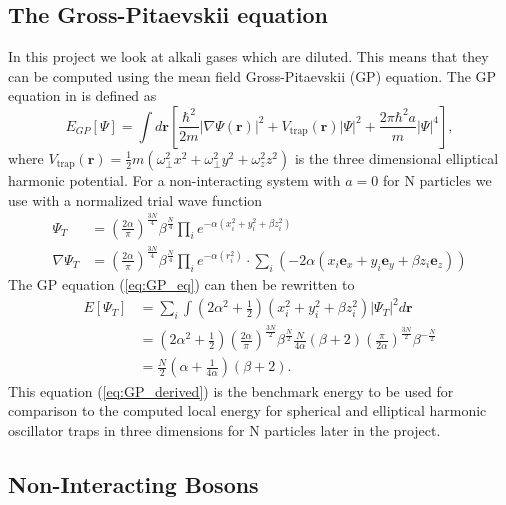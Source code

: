 \documentclass[12pt,a4paper,english]{article}
\begin{document}
\subsection{The Gross-Pitaevskii equation}
\label{subsect:GP_eq}
In this project we look at alkali gases which are diluted. This means that they can be computed using the mean field Gross-Pitaevskii (GP) equation. The GP equation in \citet{dubois2001bose} is defined as
\begin{equation}
\label{eq:GP_eq}
E_{GP}[\Psi]=\int d\textbf{r}\left[\frac{\hbar^2}{2m}|\nabla\Psi(\textbf{r})|^2+V_{\text{trap}}(\textbf{r})|\Psi|^2+\frac{2\pi\hbar^2a}{m}|\Psi|^4\right],
\end{equation}
where $V_{\text{trap}}(\textbf{r})=\frac{1}{2}m(\omega_{\perp}^2x^2+\omega_{\perp}^2y^2+\omega_z^2z^2)$ is the three dimensional elliptical harmonic potential. For a non-interacting system with $a=0$ for N particles we use with a normalized trial wave function 
\begin{align}
\label{eq:norm_WF_T}
\Psi_T&=\left(\frac{2\alpha}{\pi}\right)^{\frac{3N}{4}}\beta^{\frac{N}{4}}\prod_{i}e^{-\alpha(x_i^2+y_i^2+\beta z_i^2)}\\
\nabla\Psi_T&=\left(\frac{2\alpha}{\pi}\right)^{\frac{3N}{4}}\beta^{\frac{N}{4}}\prod_{i}e^{-\alpha(r_i^2)}\cdot\sum_i(-2\alpha(x_i\textbf{e}_x+y_i\textbf{e}_y+\beta z_i\textbf{e}_z))
\end{align}
The GP equation (\ref{eq:GP_eq}) can then be rewritten to
\begin{align}
\label{eq:GP_derived}
E[\Psi_T]&=\sum_i\int(2\alpha^2+\frac{1}{2})(x_i^2+y_i^2+\beta z_i^2)|\Psi_T|^2d\textbf{r}\nonumber\\
&=(2\alpha^2+\frac{1}{2})\left(\frac{2\alpha}{\pi}\right)^{\frac{3N}{2}}\beta^{\frac{N}{2}}\frac{N}{4\alpha}(\beta+2)\left(\frac{\pi}{2\alpha}\right)^{\frac{3N}{2}}\beta^{-\frac{N}{2}}\nonumber\\
&=\frac{N}{2}\left(\alpha+\frac{1}{4\alpha}\right)(\beta+2).
\end{align}
This equation (\ref{eq:GP_derived}) is the benchmark energy to be used for comparison to the computed local energy for spherical and elliptical harmonic oscillator traps in three dimensions for N particles later in the project.

\subsection{Non-Interacting Bosons}
\label{subsect:non-int}
\end{document}
